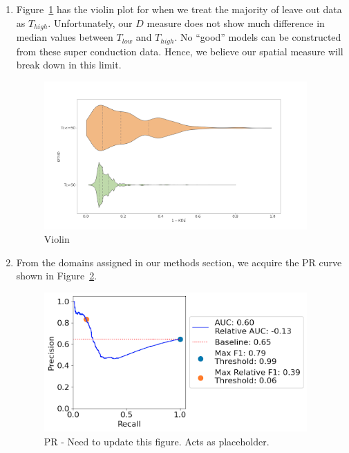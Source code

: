 \begin{enumerate}
\begin{enumerate}
        \item Figure~\ref{cond_low_chemical} has the violin plot for when we treat the majority of leave out data as $T_{high}$. Unfortunately, our $D$ measure does not show much difference in median values between $T_{low}$ and $T_{high}$. No ``good'' models can be constructed from these super conduction data. Hence, we believe our spatial measure will break down in this limit.

        \begin{figure}[H]
        \centering
        \includegraphics[width=0.95\textwidth]{figures/cond_low_chemical.png}
        \caption{Violin}
        \label{cond_low_chemical}
        \end{figure}

        \item From the domains assigned in our methods section, we acquire the PR curve shown in Figure~\ref{cond_low_chemical_pr}.

        \begin{figure}[H]
        \centering
        \includegraphics[width=0.95\textwidth]{figures/cond_low_chemical_pr.png}
        \caption{PR - Need to update this figure. Acts as placeholder.}
        \label{cond_low_chemical_pr}
        \end{figure}


\end{enumerate}
\end{enumerate}

